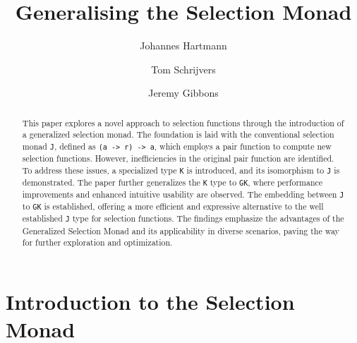 \documentclass[runningheads]{llncs}
\newcommand{\ignore}[1]{}
\begin{document}
\title{Generalising the Selection Monad}

\author{
    Johannes Hartmann \and 
    Tom Schrijvers\and 
    Jeremy Gibbons
}
%


%
\maketitle              %
%
\begin{abstract}
This paper explores a novel approach to selection functions through the
introduction of a generalized selection monad. The foundation is laid
with the conventional selection monad \texttt{J}, defined as
\texttt{(a\ -\textgreater{}\ r)\ -\textgreater{}\ a}, which employs a
pair function to compute new selection functions. However,
inefficiencies in the original pair function are identified. To address
these issues, a specialized type \texttt{K} is introduced, and its
isomorphism to \texttt{J} is demonstrated. The paper further generalizes
the \texttt{K} type to \texttt{GK}, where performance improvements and
enhanced intuitive usability are observed. The embedding between
\texttt{J} to \texttt{GK} is established, offering a more efficient and
expressive alternative to the well established \texttt{J} type for
selection functions. The findings emphasize the advantages of the
Generalized Selection Monad and its applicability in diverse scenarios,
paving the way for further exploration and optimization.

\end{abstract}
%
%
%
\ignore{

> {-# LANGUAGE ImpredicativeTypes #-}
> {-# LANGUAGE ScopedTypeVariables #-}

> import Prelude hiding ((>>=), return, pure, (<*>), fmap, sequence, pred)
> import Data.Function (on)
> import Data.List

}

\section{Introduction to the Selection
Monad}\label{introduction-to-the-selection-monad}
\end{document}
